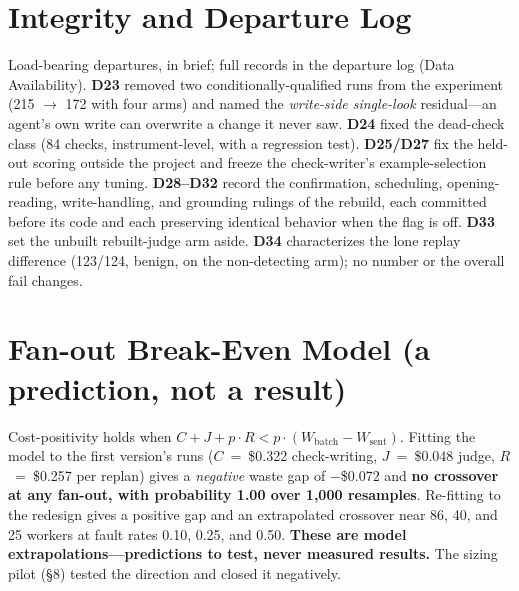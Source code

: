 \documentclass[acmsmall,screen]{acmart}
\begin{document}
\section{Integrity and Departure Log}
Load-bearing departures, in brief; full records in the departure log (Data
Availability). \textbf{D23} removed two conditionally-qualified runs from the
experiment (215 $\rightarrow$ 172 with four arms) and named the \emph{write-side
single-look} residual---an agent's own write can overwrite a change it never
saw. \textbf{D24} fixed the dead-check class (84 checks, instrument-level, with a
regression test). \textbf{D25/D27} fix the held-out scoring outside the project
and freeze the check-writer's example-selection rule before any tuning.
\textbf{D28--D32} record the confirmation, scheduling, opening-reading,
write-handling, and grounding rulings of the rebuild, each committed before its
code and each preserving identical behavior when the flag is off. \textbf{D33}
set the unbuilt rebuilt-judge arm aside. \textbf{D34} characterizes the lone
replay difference (123/124, benign, on the non-detecting arm); no number or the
overall fail changes.

\section{Fan-out Break-Even Model (a prediction, not a result)}
Cost-positivity holds when
$C + J + p\cdot R < p\cdot(W_{\mathrm{batch}} - W_{\mathrm{sent}})$. Fitting the
model to the first version's runs ($C$~=~\$0.322 check-writing, $J$~=~\$0.048
judge, $R$~=~\$0.257 per replan) gives a \emph{negative} waste gap of
$-$\$0.072 and \textbf{no crossover at any fan-out, with probability 1.00 over
1,000 resamples}. Re-fitting to the redesign gives a positive gap and an
extrapolated crossover near 86, 40, and 25 workers at fault rates 0.10, 0.25,
and 0.50. \textbf{These are model extrapolations---predictions to test, never
measured results.} The sizing pilot (\S8) tested the direction and closed it
negatively.
\end{document}
